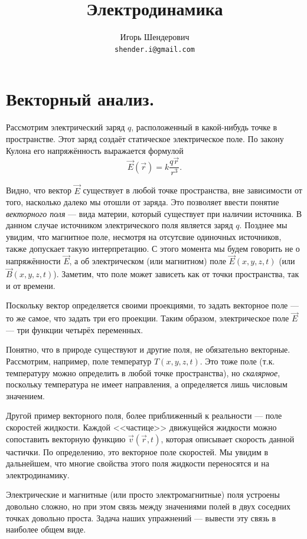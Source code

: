\documentclass[11pt,a4paper]{article}
\title{Электродинамика}
\author{Игорь Шендерович\\\texttt{shender.i@gmail.com}}
\numberwithin{equation}{section}
\begin{document}
\maketitle
\section{Векторный анализ.}

Рассмотрим электрический заряд $q$, расположенный в какой-нибудь точке
в пространстве. Этот заряд создаёт статическое электрическое поле. По
закону Кулона его напряжённость выражается формулой
\begin{equation}
  \label{eq:coulomb}
  \vec{E}(\vec{r}) =k \frac{q \vec{r}}{r^3}.
\end{equation}

Видно, что вектор $\vec{E}$ существует в любой точке пространства, вне
зависимости от того, насколько далеко мы отошли от заряда. Это
позволяет ввести понятие \textit{векторного поля} --- вида материи,
который существует при наличии источника. В данном случае источником
электрического поля является заряд $q$. Позднее мы увидим, что
магнитное поле, несмотря на отсутсвие одиночных источников, также
допускает такую интерпретацию. С этого момента мы будем говорить не о
напряжённости $\vec{E}$, а об электрическом (или магнитном) поле
$\vec{E}(x,y,z,t)$ (или $\vec{B}(x,y,z,t)$). Заметим, что поле может
зависеть как от точки пространства, так и от времени. 

Поскольку вектор определяется своими проекциями, то задать векторное
поле --- то же самое, что задать три его проекции. Таким образом,
электрическое поле $\vec{E}$ --- три функции четырёх переменных. 

Понятно, что в природе существуют и другие поля, не обязательно
векторные. Рассмотрим, например, поле температур $T(x,y,z,t)$. Это
тоже поле (т.к. температуру можно определить в любой точке
пространства), но \textit{скалярное}, поскольку температура не имеет
направления, а определяется лишь числовым значением. 

Другой пример векторного поля, более приближенный к реальности ---
поле скоростей жидкости. Каждой <<частице>> движущейся жидкости можно
сопоставить векторную функцию $\vec{v}(\vec{r},t)$, которая описывает
скорость данной частички. По определению, это векторное поле
скоростей. Мы увидим в дальнейшем, что многие свойства этого поля
жидкости переносятся и на электродинамику. 

Электрические и магнитные (или просто электромагнитные) поля устроены
довольно сложно, но при этом связь между значениями полей в двух
соседних точках довольно проста. Задача наших упражнений --- вывести
эту связь в наиболее общем виде. 
\end{document}
